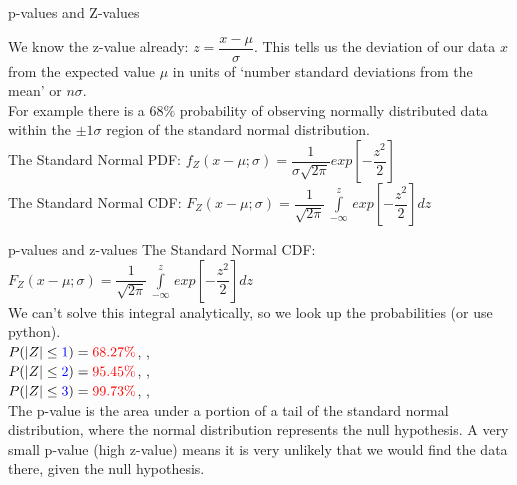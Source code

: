 \documentclass[10pt,sans,english,compress,xcolor=dvipsnames]{beamer}
\begin{document}
\begin{frame}{p-values and Z-values}
\footnotesize

We know the z-value already: $z=\dfrac{x-\mu}{\sigma}$. This tells us the deviation of our data $x$ from the expected value $\mu$ in units of `number standard deviations from the mean' or $n\sigma$.\\[1ex]

For example there is a $68\%$ probability of observing normally distributed data within the $\pm1\sigma$ region of the standard normal distribution.\\[1ex]

The Standard Normal PDF: $f_Z(x-\mu;\sigma) = \dfrac{1}{\sigma \sqrt{2\pi}} exp\left[-\dfrac{z^2}{2}\right]$ \\[1ex]

The Standard Normal CDF: $F_Z(x-\mu;\sigma) = \dfrac{1}{ \sqrt{2\pi}}\, \int\limits_{-\infty}^{z}\, exp\left[-\dfrac{z^2}{2}\right] dz $\\[1ex]


\end{frame}




\begin{frame}{p-values and z-values}
\footnotesize
The Standard Normal CDF: $F_Z(x-\mu;\sigma) = \dfrac{1}{ \sqrt{2\pi}}\, \int\limits_{-\infty}^{z}\, exp\left[-\dfrac{z^2}{2}\right] dz $\\[1ex]

We can't solve this integral analytically, so we look up the probabilities (or use python).\\[1ex]

$P(|Z| \leq \textcolor{blue}{1}) = \textcolor{red}{68.27\%}$, , \\[1ex]
$P(|Z| \leq \textcolor{blue}{2}) = \textcolor{red}{95.45\%}$, , \\[1ex]
$P(|Z| \leq \textcolor{blue}{3}) = \textcolor{red}{99.73\%}$, , \\[1ex]

The p-value is the area under a portion of a tail of the standard normal distribution, where the normal distribution represents the null hypothesis. A very small p-value (high z-value) means it is very unlikely that we would find the data there, given the null hypothesis.
\end{frame}
\end{document}
